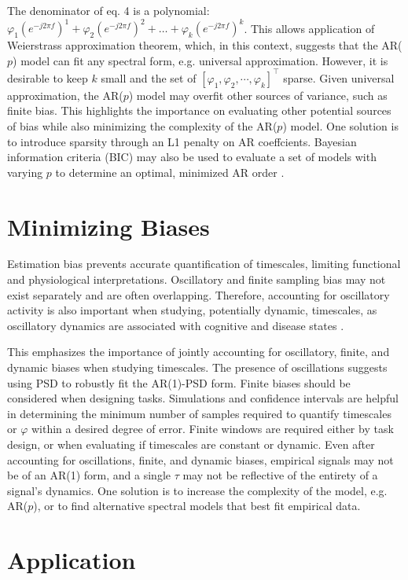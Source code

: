 \documentclass[pdflatex,sn-mathphys-num]{sn-jnl}
\begin{document}
The denominator of eq. 4 is a polynomial: $\varphi_1 (e^{-j 2 \pi f})^1 + \varphi_2 (e^{-j 2 \pi f})^2 + \dots + \varphi_k (e^{-j 2 \pi f})^k$. This allows application of Weierstrass approximation theorem, which, in this context, suggests that the AR($p$) model can fit any spectral form, e.g. universal approximation. However, it is desirable to keep $k$ small and the set of $[ \varphi_1, \varphi_2, \cdots, \varphi_k ]^{\top}$ sparse. Given universal approximation, the AR($p$) model may overfit other sources of variance, such as finite bias. This highlights the importance on evaluating other potential sources of bias while also minimizing the complexity of the AR($p$) model. One solution is to introduce sparsity through an L1 penalty on AR coeffcients. Bayesian information criteria (BIC) may also be used to evaluate a set of models with varying $p$ to determine an optimal, minimized AR order \cite{vidaurre_survey_2013}.

\section{Minimizing Biases}

Estimation bias prevents accurate quantification of timescales, limiting functional and physiological interpretations. Oscillatory and finite sampling bias may not exist separately and are often overlapping. Therefore, accounting for oscillatory activity is also important when studying, potentially dynamic, timescales, as oscillatory dynamics are associated with cognitive and disease states \cite{ward_synchronous_2003}.


This emphasizes the importance of jointly accounting for oscillatory, finite, and dynamic biases when studying timescales. The presence of oscillations suggests using PSD to robustly fit the AR(1)-PSD form. Finite biases should be considered when designing tasks. Simulations and confidence intervals are helpful in determining the minimum number of samples required to quantify timescales or $\varphi$ within a desired degree of error. Finite windows are required either by task design, or when evaluating if timescales are constant or dynamic. Even after accounting for oscillations, finite, and dynamic biases, empirical signals may not be of an AR(1) form, and a single $\tau$ may not be reflective of the entirety of a signal's dynamics. One solution is to increase the complexity of the model, e.g. AR($p$), or to find alternative spectral models that best fit empirical data.

\section{Application}
\end{document}
